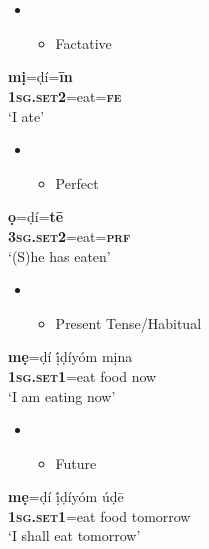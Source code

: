\documentclass[output=paper]{langsci/langscibook}
\begin{document}
\chapter[]{}
\label{bkm:Ref448083852}\setcounter{itemize}{0}
\begin{itemize}
\item \setcounter{itemize}{0}
\begin{itemize}
\item \begin{stylelsEnumerated}
Factative
\end{stylelsEnumerated}
\end{itemize}
\end{itemize}
\gll \textbf{mị}=ḍí=\textbf{\={i}n}\\
     \textbf{\textsc{1sg.set2}}=eat=\textbf{\textsc{fe}}\\
\glt ‘I ate’ \citep[44]{Kari1997}
\z

\begin{itemize}
\item \setcounter{itemize}{0}
\begin{itemize}
\item \begin{stylelsEnumerated}
Perfect
\end{stylelsEnumerated}
\end{itemize}
\end{itemize}
\gll \textbf{ọ}=ḍí=\textbf{t\={e}}\\
     \textbf{\textsc{3sg.set2}}=eat=\textbf{\textsc{prf}}\\
\glt ‘(S)he has eaten’ \citep[284]{Kari2004}
\z

\begin{itemize}
\item \setcounter{itemize}{0}
\begin{itemize}
\item \begin{stylelsEnumerated}
Present Tense/Habitual
\end{stylelsEnumerated}
\end{itemize}
\end{itemize}
\gll \textbf{mẹ}=ḍí     ị́ḍíyóm   mịna\\
     \textbf{\textsc{1sg.set1}}=eat   food   now\\
\glt ‘I am eating now’ \citep[45]{Kari1997}
\z

\begin{itemize}
\item \setcounter{itemize}{0}
\begin{itemize}
\item \begin{stylelsEnumerated}
Future
\end{stylelsEnumerated}
\end{itemize}
\end{itemize}
\gll \textbf{mẹ}=ḍí     ị́ḍíyóm   úḍ\={e}\\
     \textbf{\textsc{1sg.set1}}=eat   food   tomorrow\\
\glt ‘I shall eat tomorrow’ \citep[45]{Kari1997}
\z
\end{document}
